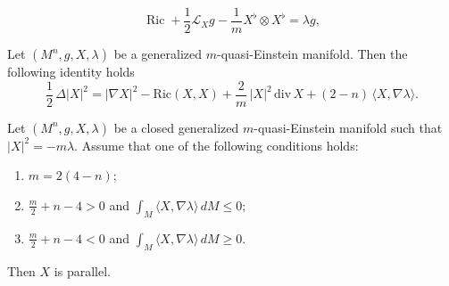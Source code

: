 \documentclass[10pt,a4paper]{amsart}
\begin{document}
\begin{equation}\label{eq:quasi-einstein}
\operatorname{Ric} + \frac{1}{2} \mathcal{L}_X g - \frac{1}{m} X^\flat \otimes X^\flat = \lambda g,
\end{equation}

\begin{lemma}\label{lem:laplacianX}
Let $(M^n,g,X,\lambda)$ be a generalized $m$-quasi-Einstein manifold. Then the following
identity holds
$$
\frac{1}{2}\,\Delta |X|^{2}
= |\nabla X|^{2}
- \mathrm{Ric}(X,X)
+ \frac{2}{m}\,|X|^{2}\,\mathrm{div}\,X
+ (2-n)\,\langle X,\nabla \lambda\rangle.
$$
\end{lemma}

\begin{proposition}\label{prop:parallel}
Let $(M^n,g,X,\lambda)$ be a closed generalized $m$-quasi-Einstein manifold such that
$
|X|^2 = -m\lambda.
$
Assume that one of the following conditions holds:
\begin{enumerate}
\item $m = 2(4-n)$;

\item $\displaystyle \frac{m}{2} + n - 4 > 0$ and 
$ 
\int_M \langle X, \nabla \lambda \rangle \, dM \leq 0;
$

\item $\displaystyle \frac{m}{2} + n - 4 < 0$ and 
$
\int_M \langle X, \nabla \lambda \rangle \, dM \geq 0.
$
\end{enumerate}
Then $X$ is parallel.
\end{proposition}
\end{document}

